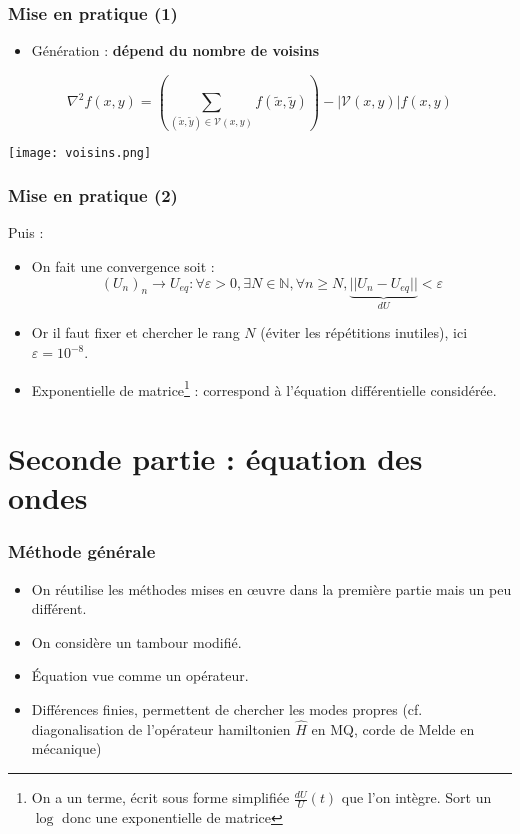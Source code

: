 \documentclass[11pt]{beamer}
\begin{document}
	\begin{frame}
		\frametitle{Mise en pratique (1)}
		\begin{itemize}
			\item Génération : \textbf{dépend du nombre de voisins} 
		\end{itemize}
		\[\nabla^2 f(x,y)=\left(\sum_{(\tilde{x},\tilde{y})\in\mathcal{V}(x,y)} f(\tilde{x},\tilde{y})\right)-|\mathcal{V}(x,y)|f(x,y)\]
		\begin{center}
			\texttt{[image: voisins.png]}
		\end{center}
	\end{frame}
	\begin{frame}
		\frametitle{Mise en pratique (2)}
		Puis :
		\begin{itemize}
			\item On fait une convergence soit :
			\[(U_n)_n\to U_{eq} : \forall\varepsilon>0, \exists N\in\mathbb{N}, \forall n\geq N, \underset{dU}{\underbrace{||U_n-U_{eq}||}}<\varepsilon\]
			\item Or il faut fixer et chercher le rang $N$ (éviter les répétitions inutiles), ici $\varepsilon=10^{-8}$.
			\item Exponentielle de matrice\footnote{On a un terme, écrit sous forme simplifiée $\frac{dU}{U}(t)$ que l'on intègre. Sort un $\log$ donc une exponentielle de matrice} : correspond à l'équation différentielle considérée.
		\end{itemize}
\end{frame}

	\section{Seconde partie : équation des ondes}

	\begin{frame}
		\tableofcontents[currentsection]
	\end{frame}

	\begin{frame}
		\frametitle{Méthode générale}
		\begin{itemize}
			\item On réutilise les méthodes mises en \oe uvre dans la première partie mais un peu différent.
			\item On considère un tambour modifié. 
			\item Équation vue comme un opérateur.
			\item Différences finies, permettent de chercher les modes propres (cf. diagonalisation de l'opérateur hamiltonien $\hat{H}$ en MQ, corde de Melde en mécanique)
		\end{itemize}	
	\end{frame}
\end{document}
